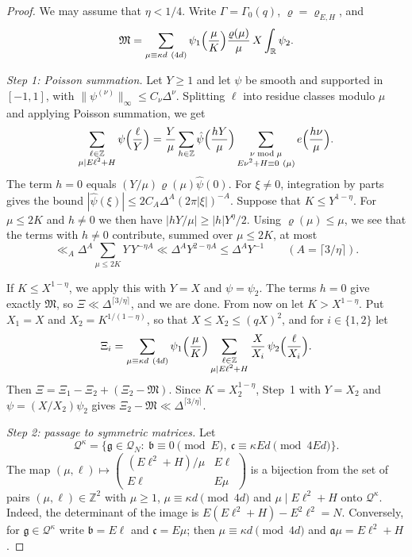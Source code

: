 \documentclass[11pt]{amsart}
\theoremstyle{remark}
\theoremstyle{definition}
\numberwithin{equation}{section}
\newcommand{\Qc}{\mathcal{Q}}
\newcommand{\Z}{\mathbb{Z}}
\newcommand{\R}{\mathbb{R}}
\newcommand{\ga}{\mathfrak{a}}
\newcommand{\gb}{\mathfrak{b}}
\newcommand{\gc}{\mathfrak{c}}
\newcommand{\fg}{\mathfrak{g}}
\begin{document}
\begin{proof}
We may assume that $\eta<1/4$. Write $\Gamma=\Gamma_0(q)$, $\varrho=\varrho_{E,H}$, and
\[
\mathfrak M=\sum_{\mu\equiv\kappa d\ (4d)}\psi_1\Bigl(\frac\mu K\Bigr)\frac{\varrho(\mu)}{\mu}\,X\int_\R\psi_2 .
\]

\emph{Step 1: Poisson summation.} Let $Y\ge1$ and let $\psi$ be smooth and supported in $[-1,1]$, with $\|\psi^{(\nu)}\|_\infty\le C_\nu\Delta^\nu$. Splitting $\ell$ into residue classes modulo $\mu$ and applying Poisson summation, we get
\begin{equation}\label{eq:poisson}
\sum_{\substack{\ell\in\Z\\ \mu\mid E\ell^2+H}}\psi\Bigl(\frac\ell Y\Bigr)=\frac Y\mu\sum_{h\in\Z}\hat\psi\Bigl(\frac{hY}{\mu}\Bigr)\sum_{\substack{\nu\bmod\mu\\ E\nu^2+H\equiv0\ (\mu)}}e\Bigl(\frac{h\nu}\mu\Bigr).
\end{equation}
The term $h=0$ equals $(Y/\mu)\varrho(\mu)\hat\psi(0)$. For $\xi\ne0$, integration by parts gives the bound $|\hat\psi(\xi)|\le2C_A\Delta^A(2\pi|\xi|)^{-A}$. Suppose that $K\le Y^{1-\eta}$. For $\mu\le2K$ and $h\ne0$ we then have $|hY/\mu|\ge|h|Y^{\eta}/2$. Using $\varrho(\mu)\le\mu$, we see that the terms with $h\ne0$ contribute, summed over $\mu\le2K$, at most
\[
\ll_A\Delta^A\sum_{\mu\le2K}Y\,Y^{-\eta A}\ll\Delta^AY^{2-\eta A}\le\Delta^AY^{-1}\qquad(A=\lceil3/\eta\rceil).
\]

If $K\le X^{1-\eta}$, we apply this with $Y=X$ and $\psi=\psi_2$. The terms $h=0$ give exactly $\mathfrak M$, so $\Xi\ll\Delta^{\lceil3/\eta\rceil}$, and we are done. From now on let $K>X^{1-\eta}$. Put $X_1=X$ and $X_2=K^{1/(1-\eta)}$, so that $X\le X_2\le(qX)^2$, and for $i\in\{1,2\}$ let
\[
\Xi_i=\sum_{\mu\equiv\kappa d\ (4d)}\psi_1\Bigl(\frac\mu K\Bigr)\sum_{\substack{\ell\in\Z\\ \mu\mid E\ell^2+H}}\frac X{X_i}\,\psi_2\Bigl(\frac\ell{X_i}\Bigr).
\]
Then $\Xi=\Xi_1-\Xi_2+(\Xi_2-\mathfrak M)$. Since $K=X_2^{1-\eta}$, Step~1 with $Y=X_2$ and $\psi=(X/X_2)\psi_2$ gives $\Xi_2-\mathfrak M\ll\Delta^{\lceil3/\eta\rceil}$.

\emph{Step 2: passage to symmetric matrices.} Let
\[
\Qc^{\kappa}=\{\fg\in\Qc_N:\ \gb\equiv0\pmod E,\ \gc\equiv\kappa Ed\pmod{4Ed}\}.
\]
The map $(\mu,\ell)\mapsto\left(\begin{smallmatrix}(E\ell^2+H)/\mu&E\ell\\ E\ell&E\mu\end{smallmatrix}\right)$ is a bijection from the set of pairs $(\mu,\ell)\in\Z^2$ with $\mu\ge1$, $\mu\equiv\kappa d\pmod{4d}$ and $\mu\mid E\ell^2+H$ onto $\Qc^{\kappa}$. Indeed, the determinant of the image is $E(E\ell^2+H)-E^2\ell^2=N$. Conversely, for $\fg\in\Qc^\kappa$ write $\gb=E\ell$ and $\gc=E\mu$; then $\mu\equiv\kappa d\pmod{4d}$ and $\ga\mu=E\ell^2+H$.


\end{proof}
\end{document}
